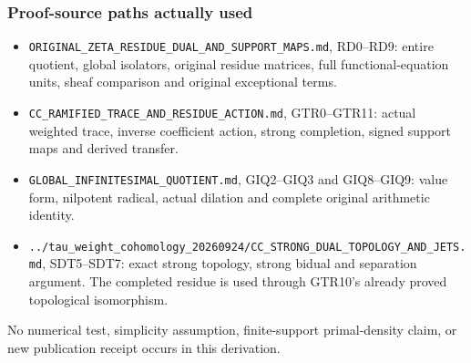 \subsubsection{Proof-source paths actually
used}\label{proof-source-paths-actually-used}

\begin{itemize}
\tightlist
\item
  \nolinkurl{ORIGINAL_ZETA_RESIDUE_DUAL_AND_SUPPORT_MAPS.md}, RD0--RD9:
  entire quotient, global isolators, original residue matrices, full
  functional-equation units, sheaf comparison and original exceptional
  terms.
\item
  \nolinkurl{CC_RAMIFIED_TRACE_AND_RESIDUE_ACTION.md}, GTR0--GTR11:
  actual weighted trace, inverse coefficient action, strong completion,
  signed support maps and derived transfer.
\item
  \nolinkurl{GLOBAL_INFINITESIMAL_QUOTIENT.md}, GIQ2--GIQ3 and
  GIQ8--GIQ9: value form, nilpotent radical, actual dilation and
  complete original arithmetic identity.
\item
  \nolinkurl{../tau_weight_cohomology_20260924/CC_STRONG_DUAL_TOPOLOGY_AND_JETS.md},
  SDT5--SDT7: exact strong topology, strong bidual and separation
  argument. The completed residue is used through GTR10's already proved
  topological isomorphism.
\end{itemize}

No numerical test, simplicity assumption, finite-support primal-density
claim, or new publication receipt occurs in this derivation.
